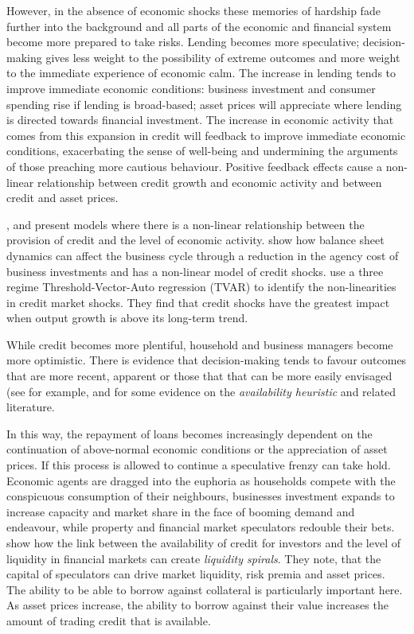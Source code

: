 \documentclass[12pt, a4paper, oneside]{article} %
\begin{document}
However, in the absence of economic shocks these memories of hardship fade further into the background and all parts of the economic and financial system become more prepared to take risks.  Lending becomes more speculative; decision-making gives less weight to the possibility of extreme outcomes and more weight to the immediate experience of economic calm.  The increase in lending tends to improve immediate economic conditions:  business investment and consumer spending rise if lending is broad-based; asset prices will appreciate where lending is directed towards financial investment.  The increase in economic activity that comes from this expansion in credit will feedback to improve immediate economic conditions, exacerbating the sense of well-being and undermining the arguments of those preaching more cautious behaviour.  Positive feedback effects cause a non-linear relationship between credit growth and economic activity and between credit and asset prices. 

\citet{Bernanke1999chapter}, \citet{BernankeGertler} and \citet{Azaraidis} present models where there is a non-linear relationship between  the provision of credit and the level of economic activity. \citet{BernankeGertlerAgency} show how balance sheet dynamics can affect the business cycle through a reduction in the agency cost of business investments and \citet{Balke} has a non-linear model of credit shocks.  \citet{Avdjiev2014} use a three regime Threshold-Vector-Auto regression (TVAR) to identify the non-linearities in credit market shocks.  They find that credit shocks have the greatest impact when output growth is above its long-term trend. 

While credit becomes more plentiful, household and business managers become more optimistic.  There is evidence that decision-making tends to favour outcomes that are more recent, apparent or those that that can be more easily envisaged (see for example, \citet{KTAvailability} and \citet{Schwartzavailability} for some evidence on the \emph{availability heuristic} and related literature.   %

In this way, the repayment of loans becomes increasingly dependent on the continuation of above-normal economic conditions or the appreciation of asset prices.  If this process is allowed to continue a speculative frenzy can take hold.  Economic agents are dragged into the euphoria as households compete with the conspicuous consumption of their neighbours, businesses investment expands to increase capacity and market share in the face of booming demand and endeavour, while property and financial market speculators redouble their bets.  \citet{BrunnermeierLiquidity} show how the link between the availability of credit for investors and the level of liquidity in financial markets can create \emph{liquidity spirals}.   They note,  that the capital of speculators can drive market liquidity, risk premia and asset prices.  The ability to be able to borrow against collateral is particularly important here.  As asset prices increase, the ability to borrow against their value increases the amount of trading credit that is available.  
\end{document}
